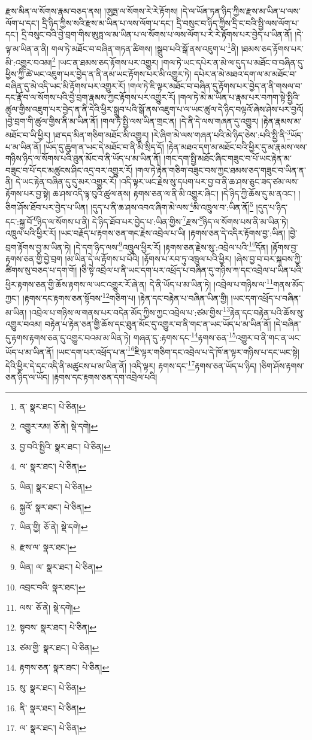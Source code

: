 རྫས་མིན་ལ་སོགས་རྣམ་བཅད་ནས། །ཨུཏྤ་ལ་སོགས་རེ་རེ་རྟོགས། །དེ་ལ་ཡོན་ཏན་ཉིད་ཀྱིས་རྫས་མ་ཡིན་པ་ལས་ལོག་པ་དང་། དྲི་ཉིད་ཀྱིས་སའི་རྫས་མ་ཡིན་པ་ལས་ལོག་པ་དང་། དྲི་བསུང་བ་ཉིད་ཀྱིས་དྲི་ང་བའི་སྤྱི་ལས་ལོག་པ་དང་། དྲི་བསུང་བའི་བྱེ་བྲག་གིས་ཨུཏྤ་ལ་མ་ཡིན་པ་ལ་སོགས་པ་ལས་ལོག་པ་རེ་རེ་རྟོགས་པར་བྱེད་པ་ཡིན་ནོ། །དེ་ལྟ་མ་ཡིན་ན་ནི། གལ་ཏེ་མཐོང་བ་བཞིན་གཏན་ཚིགས། །སྒྲུབ་པའི་སྒོ་ནས་འཇུག་པ་\footnote{ན་  སྣར་ཐང་།  པེ་ཅིན། }ནི། །ཐམས་ཅད་རྟོགས་པར་མི་:འགྱུར་བའམ།\footnote{འགྱུར་རམ།  ཅོ་ནེ།  སྡེ་དགེ། } །ཡང་ན་ཐམས་ཅད་རྟོགས་པར་འགྱུར། །གལ་ཏེ་ཡང་དཔེར་ན་མེ་ལ་དུད་པ་མཐོང་བ་བཞིན་དུ་ཕྱིས་ཀྱི་ཚེ་ཡང་འཇུག་པར་བྱེད་ན་ནི་ནམ་ཡང་རྟོགས་པར་མི་འགྱུར་ཏེ། དཔེར་ན་མེ་མཐའ་དག་ལ་མ་མཐོང་བ་བཞིན་དུ་མེ་འདི་ཡང་མི་རྟོགས་པར་འགྱུར་རོ། །གལ་ཏེ་ཇི་ལྟར་མཐོང་བ་བཞིན་དུ་རྟོགས་པར་བྱེད་ན་ནི་གསལ་བ་དང་རྣོ་བ་ལ་སོགས་པའི་བྱེ་བྲག་རྣམས་ཀྱང་རྟོགས་པར་འགྱུར་རོ། །གལ་ཏེ་མེ་མ་ཡིན་པ་རྣམ་པར་བཀག་སྟེ་སྤྱིའི་ཚུལ་གྱིས་འཇུག་པར་བྱེད་ན་ནི་དེའི་ཕྱིར་སྒྲུབ་པའི་སྒོ་ནས་འཇུག་པ་ལ་ཡང་ཚུལ་དེ་ཉིད་བལྟའོ་ཞེས་ཤེས་པར་བྱའོ། །བྱེ་བྲག་གི་ཚུལ་གྱིས་ནི་མ་ཡིན་ནོ། །གལ་ཏེ་སྤྱི་ལས་ཡིན་གྲང་ན། །དེ་ནི་དེ་ལས་གཞན་དུ་འགྱུར། །རྟེན་རྣམས་མ་མཐོང་བ་ཡི་ཕྱིར། །ཐ་དད་མིན་གཅིག་མཐོང་མི་འགྱུར། །རེ་ཞིག་མེ་ལས་གཞན་པའི་མེ་ཉིད་ཅེས་:པའི་སྤྱི་ནི་\footnote{བྱ་བའི་སྤྱིའི་  སྣར་ཐང་།  པེ་ཅིན། }ཡོད་པ་མ་ཡིན་ནོ། །ཡོད་དུ་ཆུག་ན་ཡང་དེ་མཐོང་བ་ནི་མི་སྲིད་དོ། །རྟེན་མཐའ་དག་མ་མཐོང་བའི་ཕྱིར་དུ་མ་རྣམས་ལས་གཉིས་ཉིད་ལ་སོགས་པའི་ཐུན་མོང་བ་ནི་ཡོད་པ་མ་ཡིན་ནོ། །གང་དག་སྤྱི་མཐོང་ཞིང་གཟུང་བ་པོ་ཡང་རྟེན་མ་བཟུང་བ་པོ་དང་མཚུངས་ཤིང་འདྲ་བར་འགྱུར་རོ། །གལ་ཏེ་རྟེན་གཅིག་བཟུང་བས་ཀྱང་ཐམས་ཅད་གཟུང་བ་ཡིན་ན་ནི། དེ་ཡང་རྟེན་བཞིན་དུ་དུ་མར་འགྱུར་རོ། །འདི་ལྟར་ཡང་རྗེས་སུ་དཔག་པར་བྱ་བ་ནི་ཆ་ཤས་ཅུང་ཟད་ཙམ་ལས་རྟོགས་པར་བྱ་སྟེ། ཆ་ཤས་འདི་ལྟ་བུའི་ཚུལ་ནས། རྟགས་ཅན་ལ་ནི་མི་འགྱུར་ཞིང་། །དེ་ཉིད་ཀྱི་ཆོས་དུ་མ་ནའང་། །ཅིག་ཤོས་ཐོབ་པར་བྱེད་པ་ཡིན། །དུད་པ་ནི་ཆ་ཤས་འབའ་ཞིག་མེ་ལས་\footnote{ལ་  སྣར་ཐང་།  པེ་ཅིན། }མི་འཁྲུལ་བ་:ཡིན་ནོ།\footnote{ཡིན།  སྣར་ཐང་།  པེ་ཅིན། } །དུད་པ་ཉིད་དང་:སྐྱ་བོ་\footnote{སྐྱའོ་  སྣར་ཐང་།  པེ་ཅིན། }ཉིད་ལ་སོགས་པ་ནི། དེ་ཉིད་ཐོབ་པར་བྱེད་པ་:ཡིན་གྱིས་\footnote{ཡིན་གྱི།   ཅོ་ནེ།  སྡེ་དགེ། }རྫས་\footnote{རྫས་ལ་  སྣར་ཐང་། }ཉིད་ལ་སོགས་པས་ནི་མ་ཡིན་ཏེ། འཁྲུལ་པའི་ཕྱིར་རོ། །ཡང་བརྗོད་པ་རྟགས་ཅན་གང་རྗེས་འབྲེལ་པ་ཡི། །རྟགས་ཅན་དེ་འདིར་རྟོགས་བྱ་:ཡིན། །བྱེ་བྲག་རྟོགས་བྱ་མ་ཡིན་ཏེ། །དེ་དག་ཉིད་ལས་\footnote{ཡིན། ལ་  སྣར་ཐང་།  པེ་ཅིན། }འཁྲུལ་ཕྱིར་རོ། །རྟགས་ཅན་རྗེས་སུ་:འབྲེལ་པའི་\footnote{འབྲང་བའི་  སྣར་ཐང་། }དོན། །རྟོགས་བྱ་རྟགས་ཅན་གྱི་བྱེ་བྲག །མ་ཡིན་དེ་ལ་རྟོགས་པ་པོའི། །རྟོགས་པ་རབ་ཏུ་འཁྲུལ་པའི་ཕྱིར། །ཞེས་བྱ་བ་བར་སྐབས་ཀྱི་ཚིགས་སུ་བཅད་པ་དག་གོ། །ཅི་སྟེ་འབྲེལ་པ་ནི་ཡང་དག་པར་འཕྲོད་པ་བཞིན་དུ་གཉིས་ཀ་དང་འབྲེལ་པ་ཡིན་པའི་ཕྱིར་རྟགས་ཅན་གྱི་ཆོས་རྟགས་ལ་ཡང་འགྱུར་རོ་ཞེ་ན། དེ་ནི་ཡོད་པ་མ་ཡིན་ཏེ། །འབྲེལ་པ་གཉིས་ལ་\footnote{ལས་  ཅོ་ནེ།  སྡེ་དགེ། }གནས་མོད་ཀྱང་། །རྟགས་དང་རྟགས་ཅན་སྟོབས་\footnote{སྟབས་  སྣར་ཐང་།  པེ་ཅིན། }གཅིག་པ། །རྟེན་དང་བརྟེན་པ་བཞིན་ཡིན་གྱི། །ཡང་དག་འཕྲོད་པ་བཞིན་མ་ཡིན། །འབྲེལ་པ་གཉིས་ལ་གནས་པར་བདེན་མོད་ཀྱིས་ཀྱང་འབྲེལ་པ་:ཙམ་གྱིས་\footnote{ཙམ་གྱི་  སྣར་ཐང་།  པེ་ཅིན། }རྟེན་དང་བརྟེན་པའི་ཆོས་སུ་འགྱུར་བའམ། བརྟེན་པ་རྟེན་ཅན་གྱི་ཆོས་དང་ཐུན་མོང་དུ་འགྱུར་བ་ནི་གང་ན་ཡང་ཡོད་པ་མ་ཡིན་ནོ། །དེ་བཞིན་དུ་རྟགས་རྟགས་ཅན་དུ་འགྱུར་བའམ་མ་ཡིན་ཏེ། གཞན་དུ་:རྟགས་དང་\footnote{རྟགས་ཅན་  སྣར་ཐང་།  པེ་ཅིན། }རྟགས་ཅན་\footnote{སུ་  སྣར་ཐང་།  པེ་ཅིན། }འགྱུར་བ་ནི་གང་ན་ཡང་ཡོད་པ་མ་ཡིན་ནོ། །ཡང་དག་པར་འཕྲོད་པ་ན་\footnote{ནི་  སྣར་ཐང་།  པེ་ཅིན། }ཇི་ལྟར་གཅིག་དང་འབྲེལ་པ་དེ་ཁོ་ན་ལྟར་གཉིས་པ་དང་ཡང་སྟེ། དེའི་ཕྱིར་དེ་དང་འདི་ནི་མཚུངས་པ་མ་ཡིན་ནོ། །འདི་ལྟར། རྟགས་དང་\footnote{ལ་  སྣར་ཐང་།  པེ་ཅིན། }རྟགས་ཅན་ཡོད་པ་ཉིད། །ཅིག་ཤོས་རྟགས་ཅན་ཉིད་ལ་ཡོད། །རྟགས་དང་རྟགས་ཅན་དག་འབྲེལ་པའི། 